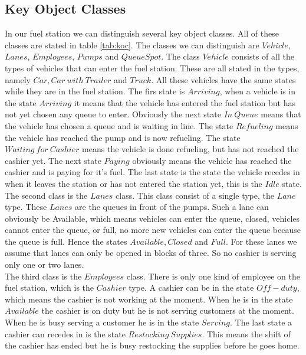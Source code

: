 \subsection{Key Object Classes}
In our fuel station we can distinguish several key object classes. All of these classes are stated in table \ref{tab:koc}. The classes we can distinguish are $Vehicle$, $Lanes$, $Employees$, $Pumps$ and $Queue Spot$. The class $Vehicle$ consists of all the types of vehicles that can enter the fuel station. These are all stated in the types, namely $Car, Car \ with \ Trailer$ and $Truck$. All these vehicles have the same states while they are in the fuel station. The firs state is $Arriving$, when a vehicle is in the state $Arriving$ it means that the vehicle has entered the fuel station but has not yet chosen any queue to enter. Obviously the next state $In \ Queue$ means that the vehicle has chosen a queue and is waiting in line. The state $Refueling$ means the vehicle has reached the pump and is now refueling. The state $Waiting \ for \ Cashier$ means the vehicle is done refueling, but has not reached the cashier yet. The next state $Paying$ obviously means the vehicle has reached the cashier and is paying for it's fuel. The last state is the state the vehicle recedes in when it leaves the station or has not entered the station yet, this is the $Idle$ state. \\
\indent The second class is the $Lanes$ class. This class consist of a single type, the $Lane$ type. These $Lanes$ are the queues in front of the pumps. Such a lane can obviously be Available, which means vehicles can enter the queue, closed, vehicles cannot enter the queue, or full, no more new vehicles can enter the queue because the queue is full. Hence the states $Available, Closed$ and $Full$. For these lanes we assume that lanes can only be opened in blocks of three. So no cashier is serving only one or two lanes.\\
\indent The third class is the $Employees$ class. There is only one kind of employee on the fuel station, which is the $Cashier$ type. A cashier can be in the state $Off-duty$, which means the cashier is not working at the moment. When he is in the state $Available$ the cashier is on duty but he is not serving customers at the moment. When he is busy serving a customer he is in the state $Serving$. The last state a cashier can recedes in is the state $Restocking \ Supplies$. This means the shift of the cashier has ended but he is busy restocking the supplies before he goes home. \\
